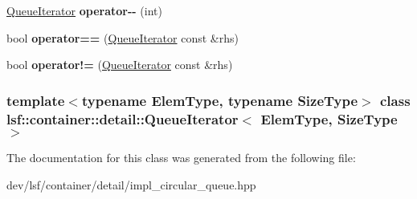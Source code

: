 \begin{DoxyCompactItemize}
\item 
\hypertarget{classlsf_1_1container_1_1detail_1_1QueueIterator_a700afa78427482c8cde88c25b7ca8a69}{
\hyperlink{classlsf_1_1container_1_1detail_1_1QueueIterator}{QueueIterator} {\bfseries operator-\/-\/} (int)}
\label{classlsf_1_1container_1_1detail_1_1QueueIterator_a700afa78427482c8cde88c25b7ca8a69}

\item 
\hypertarget{classlsf_1_1container_1_1detail_1_1QueueIterator_ac20c1c4414f7f91b6eb83a0906d7fcbd}{
bool {\bfseries operator==} (\hyperlink{classlsf_1_1container_1_1detail_1_1QueueIterator}{QueueIterator} const \&rhs)}
\label{classlsf_1_1container_1_1detail_1_1QueueIterator_ac20c1c4414f7f91b6eb83a0906d7fcbd}

\item 
\hypertarget{classlsf_1_1container_1_1detail_1_1QueueIterator_a97bfad1e060c14cd54ab3ece74f453cf}{
bool {\bfseries operator!=} (\hyperlink{classlsf_1_1container_1_1detail_1_1QueueIterator}{QueueIterator} const \&rhs)}
\label{classlsf_1_1container_1_1detail_1_1QueueIterator_a97bfad1e060c14cd54ab3ece74f453cf}

\end{DoxyCompactItemize}
\subsubsection*{template$<$typename ElemType, typename SizeType$>$ class lsf::container::detail::QueueIterator$<$ ElemType, SizeType $>$}



The documentation for this class was generated from the following file:\begin{DoxyCompactItemize}
\item 
dev/lsf/container/detail/impl\_\-circular\_\-queue.hpp\end{DoxyCompactItemize}
